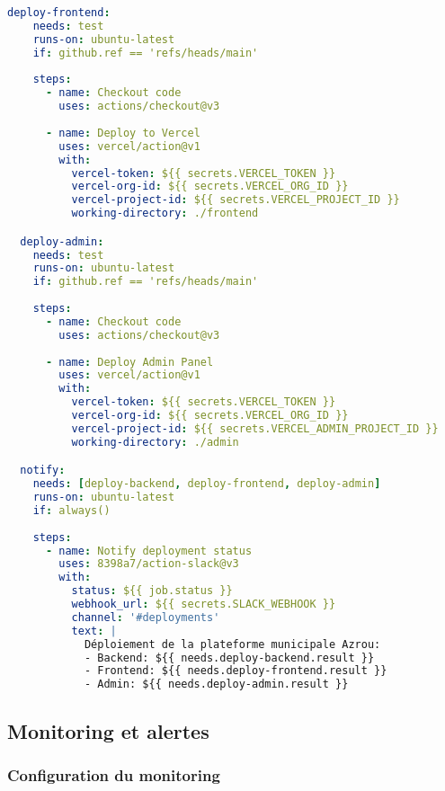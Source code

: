 \begin{lstlisting}[language=YAML, caption=.github/workflows/deploy.yml]
  deploy-frontend:
    needs: test
    runs-on: ubuntu-latest
    if: github.ref == 'refs/heads/main'
    
    steps:
      - name: Checkout code
        uses: actions/checkout@v3
      
      - name: Deploy to Vercel
        uses: vercel/action@v1
        with:
          vercel-token: ${{ secrets.VERCEL_TOKEN }}
          vercel-org-id: ${{ secrets.VERCEL_ORG_ID }}
          vercel-project-id: ${{ secrets.VERCEL_PROJECT_ID }}
          working-directory: ./frontend

  deploy-admin:
    needs: test
    runs-on: ubuntu-latest
    if: github.ref == 'refs/heads/main'
    
    steps:
      - name: Checkout code
        uses: actions/checkout@v3
      
      - name: Deploy Admin Panel
        uses: vercel/action@v1
        with:
          vercel-token: ${{ secrets.VERCEL_TOKEN }}
          vercel-org-id: ${{ secrets.VERCEL_ORG_ID }}
          vercel-project-id: ${{ secrets.VERCEL_ADMIN_PROJECT_ID }}
          working-directory: ./admin

  notify:
    needs: [deploy-backend, deploy-frontend, deploy-admin]
    runs-on: ubuntu-latest
    if: always()
    
    steps:
      - name: Notify deployment status
        uses: 8398a7/action-slack@v3
        with:
          status: ${{ job.status }}
          webhook_url: ${{ secrets.SLACK_WEBHOOK }}
          channel: '#deployments'
          text: |
            Déploiement de la plateforme municipale Azrou:
            - Backend: ${{ needs.deploy-backend.result }}
            - Frontend: ${{ needs.deploy-frontend.result }}
            - Admin: ${{ needs.deploy-admin.result }}
\end{lstlisting}

\subsection{Monitoring et alertes}

\subsubsection{Configuration du monitoring}

